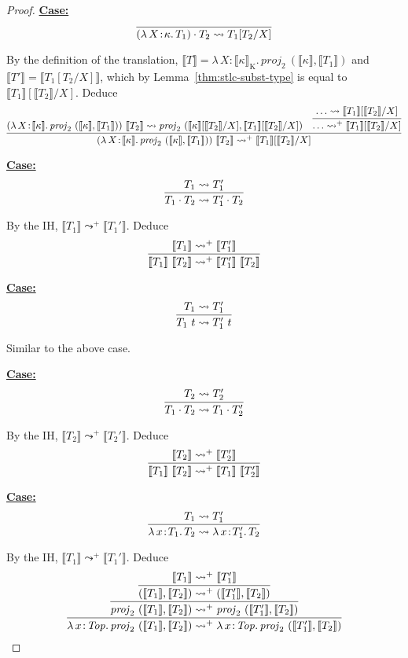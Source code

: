 \documentclass{article}
\newcommand{\abs}[4]{{#1}\, #2\! : \! #3.\, #4}
\newcommand{\interp}[1]{\llbracket #1 \rrbracket}
\newcommand{\startcase}[1]{\vspace{#1} \noindent\textbf{\underline{Case:}}}
\begin{document}
\begin{proof}
  \startcase{.2cm}
  \[
    \infer{
      (\abs{\lambda}{X}{\kappa}{T_1}) \cdot T_2 \leadsto T_1[T_2/X]
    }{}
  \]

  By the definition of the translation, \(\interp{T} =
  \abs{\lambda}{X}{\interp{\kappa}_{\text{K}}}{\mathit{proj}_2\ (\interp{\kappa},\interp{T_1})}\) and \(\interp{T'} =
  \interp{T_1[T_2/X]}\), which by Lemma~\ref{thm:stlc-subst-type} is equal to
  \(\interp{T_1}[\interp{T_2}/X]\).
  Deduce
  \[
    \infer{
      (\abs{\lambda}{X}{\interp{\kappa}}{\mathit{proj}_2\ (\interp{\kappa},\interp{T_1})})\ \interp{T_2} \leadsto^+
      \interp{T_1}[\interp{T_2}/X]
    }{
      (\abs{\lambda}{X}{\interp{\kappa}}{\mathit{proj}_2\
        (\interp{\kappa},\interp{T_1})})\ \interp{T_2}
      \leadsto
      \mathit{proj}_2\
      (\interp{\kappa}[\interp{T_2}/X],\interp{T_1}[\interp{T_2}/X])
      &
      \infer{
        \ldots \leadsto^+
        \interp{T_1}[\interp{T_2}/X]
      }{
        \ldots \leadsto \interp{T_1}[\interp{T_2}/X]
      }
    }
  \]

  \startcase{.2cm}
  \[
    \infer{
      T_1 \cdot T_2 \leadsto T_1' \cdot T_2
    }{
      T_1 \leadsto T_1'
    }
  \]

  By the IH, \(\interp{T_1} \leadsto^+ \interp{T_1'}\).
  Deduce
  \[
    \infer{
      \interp{T_1}\ \interp{T_2} \leadsto^+ \interp{T_1'}\ \interp{T_2}
    }{
      \interp{T_1} \leadsto^+ \interp{T_1'}
    }
  \]

  \startcase{.2cm}
  \[
    \infer{
      T_1\ t \leadsto T_1'\ t
    }{
      T_1 \leadsto T_1'
    }
  \]

  Similar to the above case.

  \startcase{.2cm}
  \[
    \infer{
      T_1 \cdot T_2 \leadsto T_1 \cdot T_2'
    }{
      T_2 \leadsto T_2'
    }
  \]

  By the IH, \(\interp{T_2} \leadsto^+ \interp{T_2'}\).
  Deduce
  \[
    \infer{
      \interp{T_1}\ \interp{T_2} \leadsto^+ \interp{T_1}\ \interp{T_2'}
    }{
      \interp{T_2} \leadsto^+ \interp{T_2'}
    }
  \]

  \startcase{.2cm}
  \[
    \infer{
      \abs{\lambda}{x}{T_1}{T_2} \leadsto \abs{\lambda}{x}{T_1'}{T_2}
    }{
      T_1 \leadsto T_1'
    }   
  \]

  By the IH, \(\interp{T_1} \leadsto^+ \interp{T_1'}\).
  Deduce
  \[
    \infer{
      \abs{\lambda}{x}{\mathit{Top}}{\mathit{proj}_2\
        (\interp{T_1},\interp{T_2})}
      \leadsto^+
      \abs{\lambda}{x}{\mathit{Top}}{\mathit{proj}_2\ (\interp{T_1'}, \interp{T_2})}
    }{
      \infer{
        \mathit{proj}_2\ (\interp{T_1},\interp{T_2})
        \leadsto^+
        \mathit{proj}_2\ (\interp{T_1'},\interp{T_2})
      }{
        \infer{
          (\interp{T_1},\interp{T_2})
          \leadsto^+
          (\interp{T_1'},\interp{T_2})
        }{
          \interp{T_1} \leadsto^+ \interp{T_1'}
        }
      }
    }
  \]


\end{proof}
\end{document}
